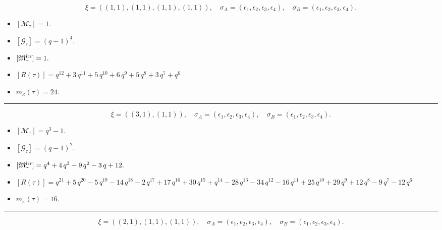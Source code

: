 \documentclass[10pt,a4paper]{amsart}
\begin{document}
$$\xi = ({(1, 1), (1, 1), (1, 1), (1, 1)}),\quad \sigma_A = ({{\epsilon_1}, {\epsilon_2}, {\epsilon_3}, {\epsilon_4}}),\quad \sigma_B = ({{\epsilon_1}, {\epsilon_2}, {\epsilon_3}, {\epsilon_4}}).$$

\begin{itemize}
 \item $[\mathcal{M}_{\tau}] = 1 .$

 \item $[\mathcal{G}_{\tau}] = {\left(q - 1\right)}^{4} .$

 \item $[{\frak M}_{\tau}^{\textrm{irr}}] = 1 .$

 \item $[R(\tau)] = q^{12} + 3 \, q^{11} + 5 \, q^{10} + 6 \, q^{9} + 5 \, q^{8} + 3 \, q^{7} + q^{6} $

 \item $m_{\kappa}(\tau) = 24 .$

 \end{itemize}
\noindent\rule{8cm}{0.4pt}

$$\xi = ({(3, 1)}, {(1, 1)}),\quad \sigma_A = ({{\epsilon_1, \epsilon_2, \epsilon_3}}, {{\epsilon_4}}),\quad \sigma_B = ({{\epsilon_1, \epsilon_2, \epsilon_3}}, {{\epsilon_4}}).$$

\begin{itemize}
 \item $[\mathcal{M}_{\tau}] = q^{3} - 1 .$

 \item $[\mathcal{G}_{\tau}] = {\left(q - 1\right)}^{2} .$

 \item $[{\frak M}_{\tau}^{\textrm{irr}}] = q^{4} + 4 \, q^{3} - 9 \, q^{2} - 3 \, q + 12 .$

 \item $[R(\tau)] = q^{21} + 5 \, q^{20} - 5 \, q^{19} - 14 \, q^{18} - 2 \, q^{17} + 17 \, q^{16} + 30 \, q^{15} + q^{14} - 28 \, q^{13} - 34 \, q^{12} - 16 \, q^{11} + 25 \, q^{10} + 29 \, q^{9} + 12 \, q^{8} - 9 \, q^{7} - 12 \, q^{6} $

 \item $m_{\kappa}(\tau) = 16 .$

 \end{itemize}
\noindent\rule{8cm}{0.4pt}

$$\xi = ({(2, 1), (1, 1)}, {(1, 1)}),\quad \sigma_A = ({{\epsilon_1, \epsilon_2}, {\epsilon_3}}, {{\epsilon_4}}),\quad \sigma_B = ({{\epsilon_1, \epsilon_2}, {\epsilon_3}}, {{\epsilon_4}}).$$
\end{document}
